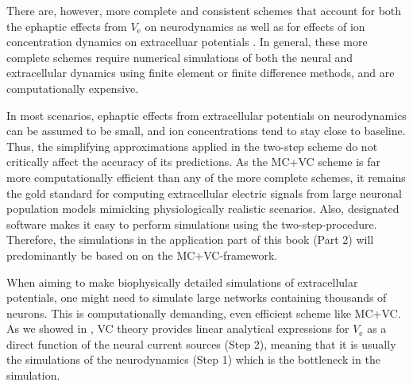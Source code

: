  
 

There are, however, more complete and consistent schemes that account for both the ephaptic effects from $V_\text{e}$  on neurodynamics as well as for effects of ion concentration dynamics on extracelluar potentials
. 
In general, these more complete schemes require numerical simulations of both the neural and extracellular dynamics using finite element or finite difference methods, and are computationally expensive.

In most scenarios, ephaptic effects from extracellular potentials on neurodynamics can be assumed to be small, and ion concentrations tend to stay close to baseline. Thus, the simplifying approximations applied in the two-step scheme do not critically affect the accuracy of its predictions. As the MC+VC scheme is far more computationally efficient than any of the more complete schemes, it remains the gold standard for computing extracellular electric signals from large neuronal population models mimicking physiologically realistic scenarios. Also, designated software makes it easy to perform simulations using the two-step-procedure. Therefore, the simulations in the application part of this book (Part 2) will predominantly be based on on the MC+VC-framework.

When aiming to make biophysically detailed simulations of extracellular potentials, one might need to simulate large networks containing thousands of neurons. 
This is computationally demanding, even  efficient scheme like MC+VC.
 As we showed in , VC theory provides linear analytical expressions for $V_\text{e}$  as a direct function of the neural current sources (Step 2), meaning that it is usually the simulations of the neurodynamics (Step 1) which is the bottleneck in the simulation. 

